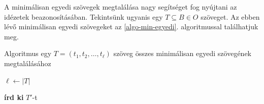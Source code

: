 \documentclass{article}
\begin{document}
A minimálisan egyedi szövegek megtalálása nagy segítséget fog nyújtani az idézetek beazonosításában.
Tekintsünk ugyanis egy $T\subseteq B\in O$ szöveget. Az ebben lévő minimálisan egyedi szövegeket
az \ref{algo-min-egyedi}. algoritmussal találhatjuk meg.

\begin{algorithm}
\caption{Algoritmus egy $T=(t_1,t_2,\ldots,t_\ell)$ szöveg összes minimálisan egyedi szövegének megtalálásához}
\label{algo-min-egyedi}
\begin{algorithmic}[1]
 \State $\ell \gets |T|$
  \EndFor
 \EndFor

   \Else
      \State \textbf{írd ki} {$T'$}-t
    \Else
    \EndIf
   \EndIf
  \EndFor
 \EndFor
\EndProcedure
\end{algorithmic}
\end{algorithm}
\end{document}

